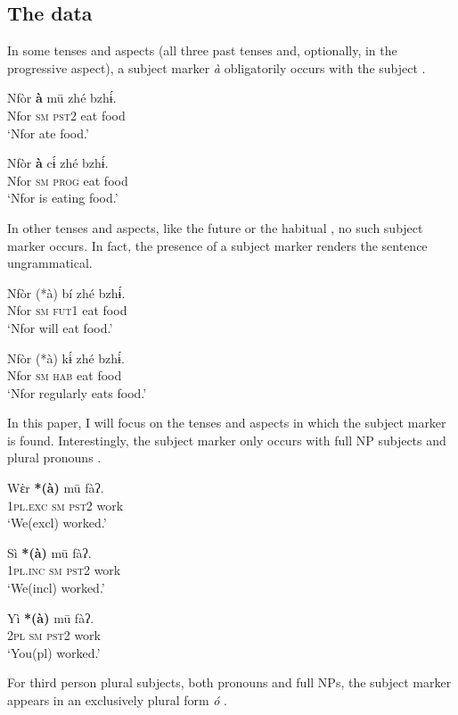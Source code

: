 \documentclass[output=paper]{langscibook}
\begin{document}
\subsection{The data}

In some tenses and aspects (all three past
tenses and, optionally, in the progressive aspect), a subject marker
\textit{à} obligatorily occurs with the subject .

\ea\label{ex:johanneshein:SM}
\begin{xlist} 
\ex 
\gll Nfòr \textbf{à} mū zhé bzhɨ́.\\
Nfor \textsc{sm} \textsc{pst2} eat food\\
\glt `Nfor ate food.'

\ex
\gll Nfòr \textbf{à} cɨ́ zhé bzhɨ́.\\
Nfor \textsc{sm} \textsc{prog} eat food\\
\glt `Nfor is eating food.'
\end{xlist}
\z
In other tenses and aspects, like the future  or the habitual
, no such subject marker occurs. In fact, the presence of a
subject marker renders the sentence ungrammatical.

\ea
\begin{xlist}
\ex\label{ex:johanneshein:NSMa}
\gll Nfòr (*à) bí zhé bzhɨ́.\\
Nfor \hphantom{(*}\textsc{sm} \textsc{fut1} eat food\\
\glt `Nfor will eat food.'

\ex \label{ex:johanneshein:NSMb}
\gll Nfòr (*à) kɨ́ zhé bzhɨ́.\\
Nfor \hphantom{(*}\textsc{sm} \textsc{hab} eat food\\
\glt `Nfor regularly eats food.'
\end{xlist}
\z
In this paper, I will focus on the tenses
and aspects in which the subject marker is found. Interestingly, the subject marker only occurs with full NP subjects
 and plural pronouns .\largerpage

\ea\label{ex:johanneshein:pluralpron}
\begin{xlist}
\ex 
\gll Wὲr \textbf{*(à)} mū fàʔ.\label{ex:pl-pron-insitu1}\\
\textsc{1pl.exc} \hphantom{(*}\textsc{sm} \textsc{pst2} work\\
\glt `We(excl) worked.'

\ex
\gll Sì \textbf{*(à)} mū fàʔ.\label{ex:pl-pron-insitu2}\\
\textsc{1pl.inc} \hphantom{(*}\textsc{sm} \textsc{pst2} work\\
\glt `We(incl) worked.'

\ex
\gll Yì \textbf{*(à)} mū fàʔ.\label{ex:pl-pron-insitu3}\\
\textsc{2pl} \hphantom{(*}\textsc{sm} \textsc{pst2} work\\
\glt `You(pl) worked.'
\end{xlist}
\z
For third person plural subjects, both pronouns and full NPs, the
subject marker appears in an exclusively plural form \textit{ó}
.
\end{document}
